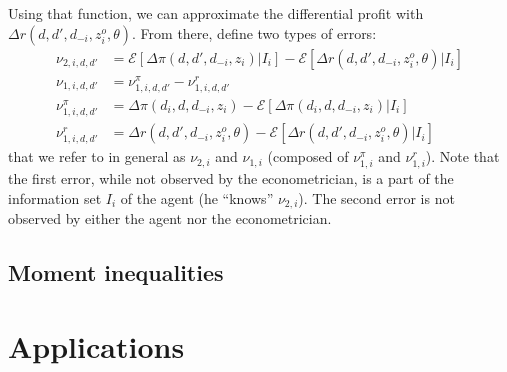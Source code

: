 Using that function, we can approximate the differential profit with $\Delta r(d, d', d_{-i}, z_i^o, \theta)$. From there, define two types of errors: \begin{align*}
\nu_{2, i, d, d'} & = \mathcal{E}\left[ \Delta\pi(d, d', d_{-i}, z_i) | I_i \right] - \mathcal{E}\left[ \Delta r(d, d', d_{-i}, z_i^o, \theta) | I_i \right] \\ \nu_{1, i, d, d'} & = \nu_{1, i, d, d'}^\pi - \nu_{1, i, d, d'}^r \\ \nu_{1, i, d, d'}^\pi & = \Delta\pi(d_i, d, d_{-i}, z_i) - \mathcal{E}\left[ \Delta\pi(d_i, d, d_{-i}, z_i) | I_i \right] \\ \nu_{1, i, d, d'}^r & = \Delta r(d, d', d_{-i}, z_i^o, \theta) - \mathcal{E}\left[\Delta r(d, d', d_{-i}, z_i^o, \theta)|I_i\right]
\end{align*}
that we refer to in general as $\nu_{2,i}$ and $\nu_{1,i}$ (composed of $\nu_{1,i}^\pi$ and $\nu_{1,i}^r$). Note that the first error, while not observed by the econometrician, is a part of the information set $I_i$ of the agent (he ``knows'' $\nu_{2,i}$). The second error is not observed by either the agent nor the econometrician.

\subsection{Moment inequalities}



\section{Applications}



